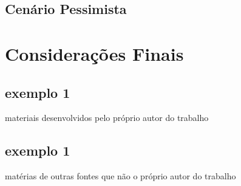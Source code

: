 \documentclass[
12pt,				%
openany,			%
oneside,			%
a4paper,			%
english,			%
french,				%
spanish,			%
brazil				%
]{abntex2}
\begin{document}
	\section{Cenário Pessimista}
	
	\chapter{Considerações Finais}



	
	\renewcommand{\bibname}{Referências Bibliográficas} %
	
	
	
	
	
	
	
	\begin{apendicesenv}
		
		\partapendices
		
		\chapter{exemplo 1}
		
		materiais desenvolvidos pelo próprio autor do trabalho
		
	\end{apendicesenv}
	
	
	\begin{anexosenv}
		
		\partanexos
		
		\chapter{exemplo 1}
		matérias de outras fontes que não o próprio autor do trabalho
		
	\end{anexosenv}
	
	\printindex
	
\end{document}
